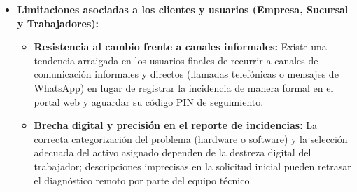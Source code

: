 \begin{itemize}
\item \textbf{Limitaciones asociadas a los clientes y usuarios (Empresa, Sucursal y Trabajadores):}
\begin{itemize}
    \item \textbf{Resistencia al cambio frente a canales informales:} Existe una tendencia arraigada en los usuarios finales de recurrir a canales de comunicación informales y directos (llamadas telefónicas o mensajes de WhatsApp) en lugar de registrar la incidencia de manera formal en el portal web y aguardar su código PIN de seguimiento.
    \item \textbf{Brecha digital y precisión en el reporte de incidencias:} La correcta categorización del problema (hardware o software) y la selección adecuada del activo asignado dependen de la destreza digital del trabajador; descripciones imprecisas en la solicitud inicial pueden retrasar el diagnóstico remoto por parte del equipo técnico.
\end{itemize}

\end{itemize}
